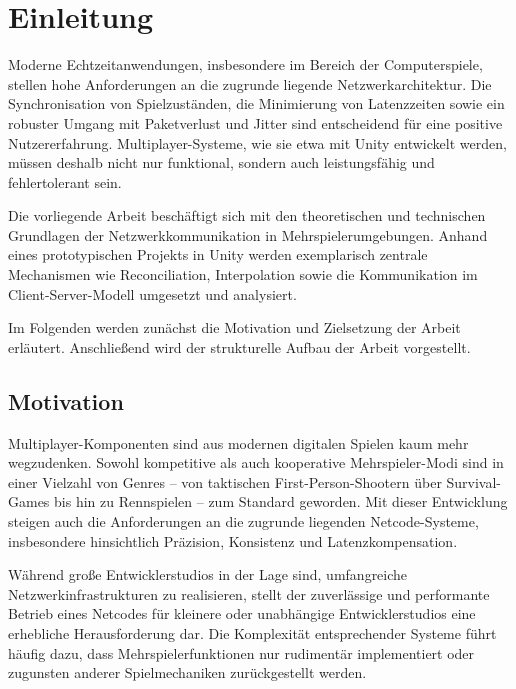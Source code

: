 \chapter{Einleitung}
\label{chapter_1}
\newcommand{\keyword}[1]{\textbf{#1}}
\newcommand{\tabhead}[1]{\textbf{#1}}
\newcommand{\code}[1]{\texttt{#1}}
\newcommand{\file}[1]{\texttt{\bfseries#1}}
\newcommand{\option}[1]{\texttt{\itshape#1}}

Moderne Echtzeitanwendungen, insbesondere im Bereich der Computerspiele, stellen hohe Anforderungen an die zugrunde liegende Netzwerkarchitektur. Die Synchronisation von Spielzuständen, die Minimierung von Latenzzeiten sowie ein robuster Umgang mit Paketverlust und Jitter sind entscheidend für eine positive Nutzererfahrung. Multiplayer-Systeme, wie sie etwa mit Unity entwickelt werden, müssen deshalb nicht nur funktional, sondern auch leistungsfähig und fehlertolerant sein.

Die vorliegende Arbeit beschäftigt sich mit den theoretischen und technischen Grundlagen der Netzwerkkommunikation in Mehrspielerumgebungen. Anhand eines prototypischen Projekts in Unity werden exemplarisch zentrale Mechanismen wie Reconciliation, Interpolation sowie die Kommunikation im Client-Server-Modell umgesetzt und analysiert.

Im Folgenden werden zunächst die Motivation und Zielsetzung der Arbeit erläutert. Anschließend wird der strukturelle Aufbau der Arbeit vorgestellt.

\section{Motivation}
Multiplayer-Komponenten sind aus modernen digitalen Spielen kaum mehr wegzudenken. Sowohl kompetitive als auch kooperative Mehrspieler-Modi sind in einer Vielzahl von Genres – von taktischen First-Person-Shootern über Survival-Games bis hin zu Rennspielen – zum Standard geworden. Mit dieser Entwicklung steigen auch die Anforderungen an die zugrunde liegenden Netcode-Systeme, insbesondere hinsichtlich Präzision, Konsistenz und Latenzkompensation.

Während große Entwicklerstudios in der Lage sind, umfangreiche Netzwerkinfrastrukturen zu realisieren, stellt der zuverlässige und performante Betrieb eines Netcodes für kleinere oder unabhängige Entwicklerstudios eine erhebliche Herausforderung dar. Die Komplexität entsprechender Systeme führt häufig dazu, dass Mehrspielerfunktionen nur rudimentär implementiert oder zugunsten anderer Spielmechaniken zurückgestellt werden.


